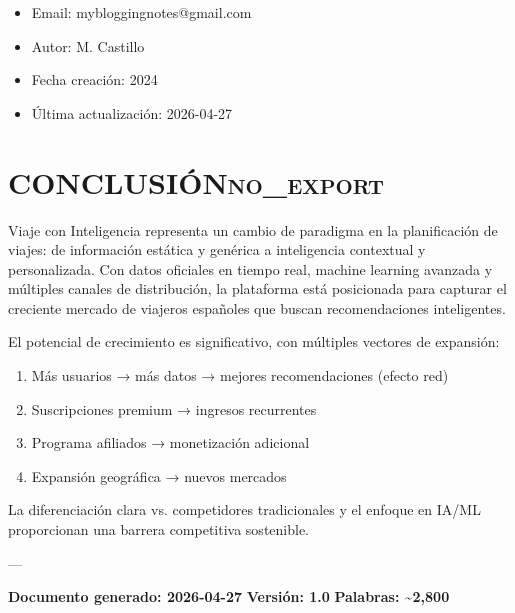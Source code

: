 \documentclass[11pt]{article}
\begin{document}
\begin{itemize}
\item Email: mybloggingnotes@gmail.com
\item Autor: M. Castillo
\item Fecha creación: 2024
\item Última actualización: 2026-04-27
\end{itemize}

\section{CONCLUSIÓN\hfill{}\textsc{no\_export}}
\label{sec:org277eef6}

Viaje con Inteligencia representa un cambio de paradigma en la planificación de viajes: de información estática y genérica a inteligencia contextual y personalizada. Con datos oficiales en tiempo real, machine learning avanzada y múltiples canales de distribución, la plataforma está posicionada para capturar el creciente mercado de viajeros españoles que buscan recomendaciones inteligentes.

El potencial de crecimiento es significativo, con múltiples vectores de expansión:
\begin{enumerate}
\item Más usuarios → más datos → mejores recomendaciones (efecto red)
\item Suscripciones premium → ingresos recurrentes
\item Programa afiliados → monetización adicional
\item Expansión geográfica → nuevos mercados
\end{enumerate}

La diferenciación clara vs. competidores tradicionales y el enfoque en IA/ML proporcionan una barrera competitiva sostenible.

---

\textbf{Documento generado: 2026-04-27}
\textbf{Versión: 1.0}
\textbf{Palabras: \textasciitilde{}2,800}
\end{document}
